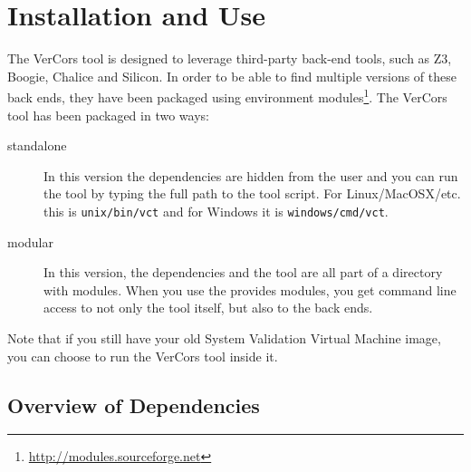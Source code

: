 \chapter{Installation and Use}

The VerCors tool is designed to leverage third-party back-end tools, such as Z3,
Boogie, Chalice and Silicon.
In order to be able to find multiple versions of these back ends, they have been packaged using
environment modules\footnote{\url{http://modules.sourceforge.net}}.
The VerCors tool has been packaged in two ways:
\begin{description}
\item[standalone] In this version the dependencies are hidden from the user
and you can run the tool by typing the full path to the tool script.
For Linux/MacOSX/etc. this is \verb+unix/bin/vct+ and for Windows
it is \verb+windows/cmd/vct+.
\item[modular] In this version, the dependencies and the tool are all part of a
directory with modules. When you use the provides modules, you get command
line access to not only the tool itself, but also to the back ends.
\end{description}

Note that if you still have your old System Validation Virtual Machine
image, you can choose to run the VerCors tool inside it.

\section{Overview of Dependencies}

